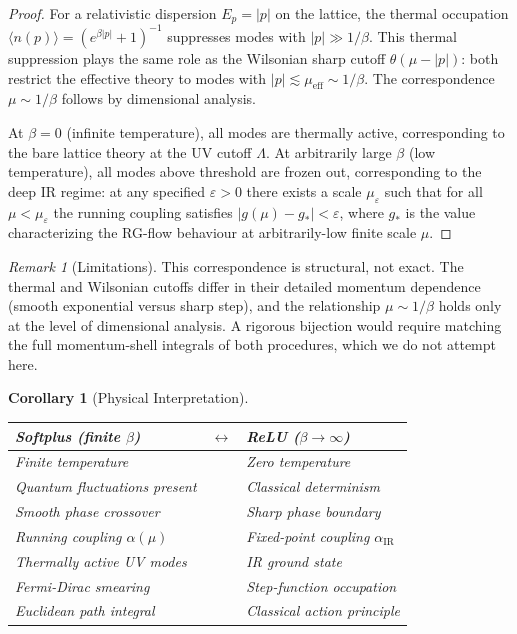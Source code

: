 \documentclass[12pt]{article}
\newtheorem{corollary}[theorem]{Corollary}
\theoremstyle{definition}
\theoremstyle{remark}
\newtheorem{remark}{Remark}[section]
\begin{document}
\begin{proof}
For a relativistic dispersion $E_p = |p|$ on the lattice, the thermal occupation $\langle n(p) \rangle = (e^{\beta|p|} + 1)^{-1}$ suppresses modes with $|p| \gg 1/\beta$. This thermal suppression plays the same role as the Wilsonian sharp cutoff $\theta(\mu - |p|)$: both restrict the effective theory to modes with $|p| \lesssim \mu_{\text{eff}} \sim 1/\beta$. The correspondence $\mu \sim 1/\beta$ follows by dimensional analysis.

At $\beta = 0$ (infinite temperature), all modes are thermally active, corresponding to the bare lattice theory at the UV cutoff $\Lambda$. At arbitrarily large $\beta$ (low temperature), all modes above threshold are frozen out, corresponding to the deep IR regime: at any specified $\varepsilon > 0$ there exists a scale $\mu_{\varepsilon}$ such that for all $\mu < \mu_{\varepsilon}$ the running coupling satisfies $|g(\mu) - g_{*}| < \varepsilon$, where $g_{*}$ is the value characterizing the RG-flow behaviour at arbitrarily-low finite scale $\mu$.
\end{proof}

\begin{remark}[Limitations]
This correspondence is structural, not exact. The thermal and Wilsonian cutoffs differ in their detailed momentum dependence (smooth exponential versus sharp step), and the relationship $\mu \sim 1/\beta$ holds only at the level of dimensional analysis. A rigorous bijection would require matching the full momentum-shell integrals of both procedures, which we do not attempt here.
\end{remark}

\begin{corollary}[Physical Interpretation]
\label{cor:duality}
\begin{center}
\renewcommand{\arraystretch}{1.3}
\begin{tabular}{lll}
\toprule
\textbf{Softplus (finite $\beta$)} & $\longleftrightarrow$ & \textbf{ReLU ($\beta \to \infty$)} \\
\midrule
Finite temperature & & Zero temperature \\
Quantum fluctuations present & & Classical determinism \\
Smooth phase crossover & & Sharp phase boundary \\
Running coupling $\alpha(\mu)$ & & Fixed-point coupling $\alpha_{\text{IR}}$ \\
Thermally active UV modes & & IR ground state \\
Fermi-Dirac smearing & & Step-function occupation \\
Euclidean path integral & & Classical action principle \\
\bottomrule
\end{tabular}
\end{center}
\end{corollary}
\end{document}
